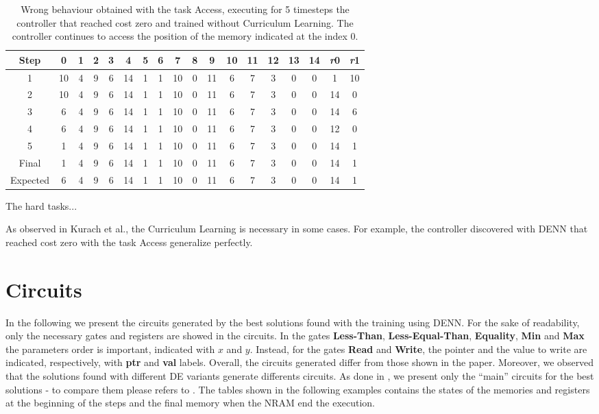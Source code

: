 \begin{table}[t]
	\centering
	\begin{tabular}{c|ccccccccccccccc|cc}
		\rowcolor{Gray}\textbf{Step} & 0 & 1 & 2 & 3 & 4 & 5 & 6 & 7 & 8 & 9 & 10 & 11 & 12 & 13 & 14 & \textit{r}0 & \textit{r}1 \\ \hline 
1 & 10 & 4 & 9 & 6 & 14 & 1 & 1 & 10 & 0 & 11 & 6 & 7 & 3 & 0 & 0 & 1 & 10 \\ 
2 & 10 & 4 & 9 & 6 & 14 & 1 & 1 & 10 & 0 & 11 & 6 & 7 & 3 & 0 & 0 & 14 & 0 \\ 
3 & 6 & 4 & 9 & 6 & 14 & 1 & 1 & 10 & 0 & 11 & 6 & 7 & 3 & 0 & 0 & 14 & 6 \\ 
4 & 6 & 4 & 9 & 6 & 14 & 1 & 1 & 10 & 0 & 11 & 6 & 7 & 3 & 0 & 0 & 12 & 0 \\ 
5 & 1 & 4 & 9 & 6 & 14 & 1 & 1 & 10 & 0 & 11 & 6 & 7 & 3 & 0 & 0 & 14 & 1 \\ \hline 
\rowcolor{Gray}Final & 1 & 4 & 9 & 6 & 14 & 1 & 1 & 10 & 0 & 11 & 6 & 7 & 3 & 0 & 0 & 14 & 1 \\
\rowcolor{Gray}Expected & 6 & 4 & 9 & 6 & 14 & 1 & 1 & 10 & 0 & 11 & 6 & 7 & 3 & 0 & 0 & 14 & 1 \\
	\end{tabular}
	\caption{Wrong behaviour obtained with the task Access, executing for 5 timesteps the controller that reached cost zero and trained without Curriculum Learning. The controller continues to access the position of the memory indicated at the index 0.}
	\label{tbl:wrong-behaviour}
\end{table}
The hard tasks...\newline

As observed in Kurach et al., the Curriculum Learning is necessary in some cases. For example, the controller discovered with DENN that reached cost zero with the task Access generalize perfectly. 


\section{Circuits}\label{subsec:circuits}
In the following we present the circuits generated by the best solutions found with  the training using DENN. For the sake of readability, only the necessary gates and registers are showed in the circuits. In the gates \textbf{Less-Than}, \textbf{Less-Equal-Than}, \textbf{Equality}, \textbf{Min} and \textbf{Max} the parameters order is important, indicated with $x$ and $y$. Instead, for the gates \textbf{Read} and \textbf{Write}, the pointer and the value to write are indicated, respectively, with \textbf{ptr} and \textbf{val} labels.\newline\newline
Overall, the circuits generated differ from those shown in the paper. Moreover, we observed that the solutions found with different DE variants generate differents circuits. As done in \cite{NRAM:2016}, we present only the ``main'' circuits for the best solutions - to compare them please refers to \cite{NRAM:2016}. The tables shown in the following examples contains the states of the memories and registers at the beginning of the steps and the final memory when the NRAM end the execution.
